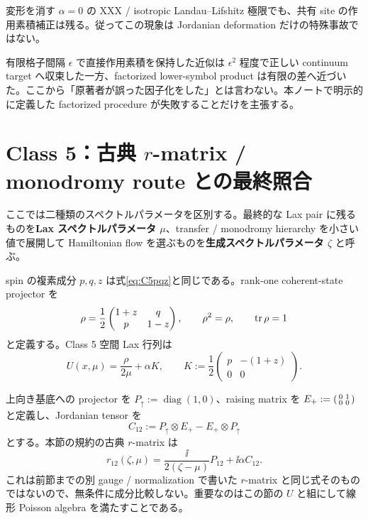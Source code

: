 変形を消す $\alpha=0$ の XXX / isotropic Landau--Lifshitz 極限でも、共有 site の作用素積補正は残る。従ってこの現象は Jordanian deformation だけの特殊事故ではない。

有限格子間隔 $\epsilon$ で直接作用素積を保持した近似は $\epsilon^2$ 程度で正しい continuum target へ収束した一方、factorized lower-symbol product は有限の差へ近づいた。ここから「原著者が誤った因子化をした」とは言わない。本ノートで明示的に定義した factorized procedure が失敗することだけを主張する。

\section{Class 5：古典 $r$-matrix / monodromy route との最終照合}
ここでは二種類のスペクトルパラメータを区別する。最終的な Lax pair に残るものを\textbf{Lax スペクトルパラメータ $\mu$}、transfer / monodromy hierarchy を小さい値で展開して Hamiltonian flow を選ぶものを\textbf{生成スペクトルパラメータ $\zeta$} と呼ぶ。

spin の複素成分 $p,q,z$ は式\eqref{eq:C5pqz}と同じである。rank-one coherent-state projector を
\begin{equation}
\rho=\frac12\begin{pmatrix}1+z&q\\p&1-z\end{pmatrix},
\qquad \rho^2=\rho,\qquad\operatorname{tr}\rho=1
\label{eq:rhoSTS}
\end{equation}
と定義する。Class 5 空間 Lax 行列は
\begin{equation}
U(x,\mu)=\frac{\rho}{2\mu}+\alpha K,
\qquad
K:=\frac12\begin{pmatrix}p&-(1+z)\\0&0\end{pmatrix}.
\label{eq:USTS}
\end{equation}

上向き基底への projector を $P_\uparrow:=\operatorname{diag}(1,0)$、raising matrix を $E_+:=\begin{psmallmatrix}0&1\\0&0\end{psmallmatrix}$ と定義し、Jordanian tensor を
\begin{equation}
C_{12}:=P_\uparrow\otimes E_+-E_+\otimes P_\uparrow
\label{eq:C12}
\end{equation}
とする。本節の規約の古典 $r$-matrix は
\begin{equation}
r_{12}(\zeta,\mu)=\frac{\ii}{2(\zeta-\mu)}P_{12}+\ii\alpha C_{12}.
\label{eq:rSTS}
\end{equation}
これは前節までの別 gauge / normalization で書いた $r$-matrix と同じ式そのものではないので、無条件に成分比較しない。重要なのはこの節の $U$ と組にして線形 Poisson algebra を満たすことである。

